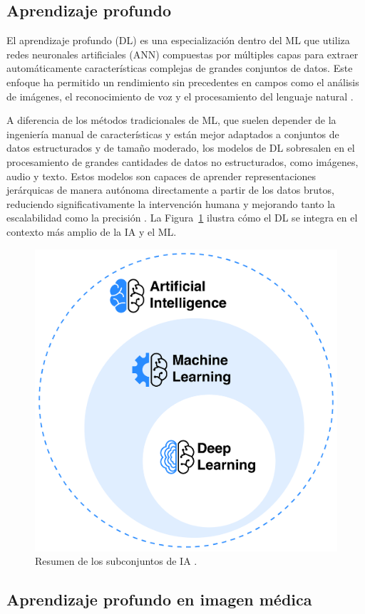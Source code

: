 \documentclass[a4paper,10pt]{book}
\begin{document}
\subsection{Aprendizaje profundo}

El aprendizaje profundo (DL) es una especialización dentro del ML que utiliza redes neuronales artificiales (ANN) compuestas por múltiples capas para extraer automáticamente características complejas de grandes conjuntos de datos. Este enfoque ha permitido un rendimiento sin precedentes en campos como el análisis de imágenes, el reconocimiento de voz y el procesamiento del lenguaje natural \cite{holdsworthWhatDeepLearning2024}.

A diferencia de los métodos tradicionales de ML, que suelen depender de la ingeniería manual de características y están mejor adaptados a conjuntos de datos estructurados y de tamaño moderado, los modelos de DL sobresalen en el procesamiento de grandes cantidades de datos no estructurados, como imágenes, audio y texto. Estos modelos son capaces de aprender representaciones jerárquicas de manera autónoma directamente a partir de los datos brutos, reduciendo significativamente la intervención humana y mejorando tanto la escalabilidad como la precisión \cite{holdsworthWhatDeepLearning2024}. La Figura~\ref{fig:ai_overview} ilustra cómo el DL se integra en el contexto más amplio de la IA y el ML.

\begin{figure}[h!]
    \centering
    \includegraphics[width=0.5\linewidth]{reports//assets/ai.png}
    \caption[Resumen de subconjuntos de IA]{Resumen de los subconjuntos de IA \cite{nasaWhatArtificialIntelligence}.}
    \label{fig:ai_overview}
\end{figure}

\subsection{Aprendizaje profundo en imagen médica}
\end{document}
